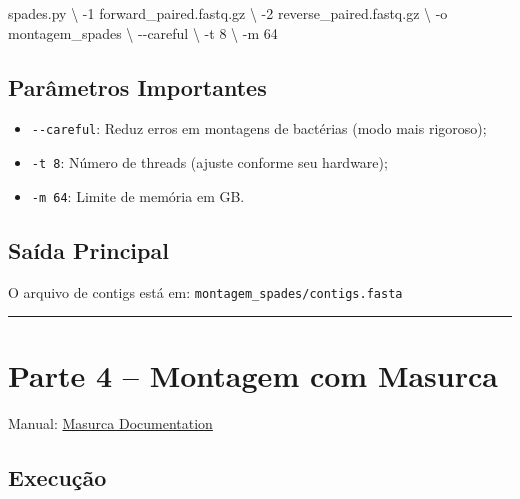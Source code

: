\documentclass[
  brazilian,
  letterpaper,
  DIV=11,
  numbers=noendperiod]{scrartcl}
\newenvironment{Shaded}{\begin{snugshade}}{\end{snugshade}}
\newcommand{\AttributeTok}[1]{\textcolor[rgb]{0.40,0.45,0.13}{#1}}
\newcommand{\DataTypeTok}[1]{\textcolor[rgb]{0.68,0.00,0.00}{#1}}
\newcommand{\ExtensionTok}[1]{\textcolor[rgb]{0.00,0.23,0.31}{#1}}
\newcommand{\NormalTok}[1]{\textcolor[rgb]{0.00,0.23,0.31}{#1}}
\providecommand{\tightlist}{%
  \setlength{\itemsep}{0pt}\setlength{\parskip}{0pt}}
\begin{document}
\begin{Shaded}
\begin{Highlighting}[]
\ExtensionTok{spades.py} \DataTypeTok{\textbackslash{}}
    \AttributeTok{{-}1}\NormalTok{ forward\_paired.fastq.gz }\DataTypeTok{\textbackslash{}}
    \AttributeTok{{-}2}\NormalTok{ reverse\_paired.fastq.gz }\DataTypeTok{\textbackslash{}}
    \AttributeTok{{-}o}\NormalTok{ montagem\_spades }\DataTypeTok{\textbackslash{}}
    \AttributeTok{{-}{-}careful} \DataTypeTok{\textbackslash{}}
    \AttributeTok{{-}t}\NormalTok{ 8 }\DataTypeTok{\textbackslash{}}
    \AttributeTok{{-}m}\NormalTok{ 64}
\end{Highlighting}
\end{Shaded}

\subsection{Parâmetros Importantes}\label{paruxe2metros-importantes}

\begin{itemize}
\tightlist
\item
  \texttt{-\/-careful}: Reduz erros em montagens de bactérias (modo mais
  rigoroso);
\item
  \texttt{-t\ 8}: Número de threads (ajuste conforme seu hardware);
\item
  \texttt{-m\ 64}: Limite de memória em GB.
\end{itemize}

\subsection{Saída Principal}\label{sauxedda-principal}

O arquivo de contigs está em: \texttt{montagem\_spades/contigs.fasta}

\begin{center}\rule{0.5\linewidth}{0.5pt}\end{center}

\section{Parte 4 -- Montagem com
Masurca}\label{parte-4-montagem-com-masurca}

Manual: \href{https://masurca.readthedocs.io/en/latest/}{Masurca
Documentation}

\subsection{Execução}\label{execuuxe7uxe3o-2}
\end{document}
